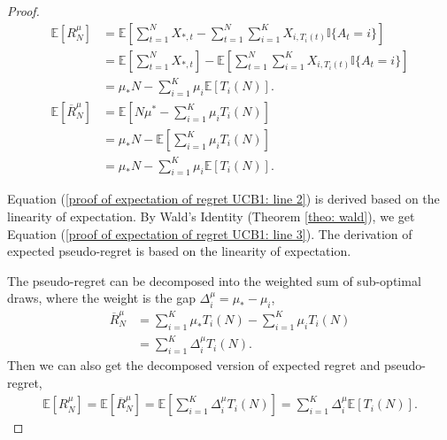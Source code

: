 \begin{proof}
\begin{align}
    \mathbb{E}[R^\mu_N] &= \mathbb{E}\left[\sum_{t=1}^{N} X_{\ast, t}-\sum_{t=1}^{N} \sum_{i = 1}^{K} X_{i, T_i(t)} \mathbb{I}\{A_t = i\}\right]\\
\label{proof of expectation of regret UCB1: line 2}
    &= \mathbb{E}\left[\sum_{t=1}^{N} X_{\ast, t}\right]- \mathbb{E}\left[\sum_{t=1}^{N} \sum_{i = 1}^{K} X_{i, T_i(t)} \mathbb{I}\{A_t = i\}\right] \\
\label{proof of expectation of regret UCB1: line 3}
    &= \mu_\ast N - \sum_{i = 1}^{K} \mu_i \mathbb{E}[T_i(N)].\\
    \mathbb{E}[\overline{R}^\mu_N] &= \mathbb{E}\left[N \mu^{*}-\sum_{i = 1}^{K} \mu_i T_i(N)\right]\\
    &= \mu_\ast N - \mathbb{E}\left[\sum_{i = 1}^{K} \mu_i T_i(N)\right] \\
    &= \mu_\ast N - \sum_{i = 1}^{K} \mu_i \mathbb{E}\left[T_i(N)\right].
\end{align}

Equation (\ref{proof of expectation of regret UCB1: line 2}) is derived based on the linearity of expectation. By Wald's Identity (Theorem \ref{theo: wald}), we get Equation (\ref{proof of expectation of regret UCB1: line 3}). The derivation of expected pseudo-regret is based on the linearity of expectation.

The pseudo-regret can be decomposed into the weighted sum of sub-optimal draws, where the weight is the gap $\Delta^\mu_i = \mu_\ast - \mu_i$,
\begin{align}
    \overline{R}^\mu_N &= \sum_{i=1}^K \mu_\ast T_i(N) - \sum_{i = 1}^{K} \mu_i T_i(N) \\
    &= \sum_{i=1}^K \Delta^\mu_i T_i(N).
\end{align}
Then we can also get the decomposed version of expected regret and pseudo-regret,
\begin{align}
\mathbb{E}[R^\mu_N] = \mathbb{E}[\overline{R}^\mu_N] = \mathbb{E}\left[\sum_{i=1}^K \Delta^\mu_i T_i(N)\right] = \sum_{i=1}^K \Delta^\mu_i \mathbb{E}[T_i(N)].
\end{align}
\end{proof}

